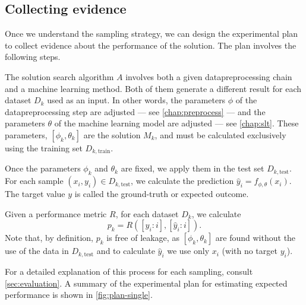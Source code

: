 
\subsection{Collecting evidence}

Once we understand the sampling strategy, we can design the experimental plan to collect
evidence about the performance of the solution.  The plan involves the following steps.

The solution search algorithm $A$ involves both a
given \gls{datapreprocessing} chain and a machine learning method.  Both of them generate a
different result for each dataset $D_k$ used as an input.  In other words, the parameters
$\phi$ of the \gls{datapreprocessing} step are adjusted --- see \cref{chap:preprocess} --- and the
parameters $\theta$ of the machine learning \gls{model} are adjusted --- see \cref{chap:slt}.
These parameters, $\left[\phi_k, \theta_k\right]$ are the solution $M_k$, and must be
calculated exclusively using the training set $D_{k,\text{train}}$.

Once the parameters $\phi_k$ and $\theta_k$ are fixed, we apply them
in the test set $D_{k,\text{test}}$.  For each sample $(x_i, y_i) \in D_{k,\text{test}}$,
we calculate the prediction $\hat{y}_i = f_{\phi,\theta}(x_i)$.  The target value $y$ is
called the ground-truth or expected outcome.

Given a performance metric $R$, for each dataset $D_k$, we calculate
$$p_k = R\!\left(\left[y_i : i\right], \left[\hat{y}_i : i\right]\right)\text{.}$$
Note that, by definition, $p_k$ is free of \gls{leakage}, as $\left[\phi_k,
\theta_k\right]$ are found without the use of the data in $D_{k,\text{test}}$ and to
calculate $\hat{y}_i$ we use only $x_i$ (with no target $y_i$).

For a detailed explanation of this process for each sampling, consult
\cref{sec:evaluation}.
A summary of the experimental plan for estimating expected performance is shown in
\cref{fig:plan-single}.

